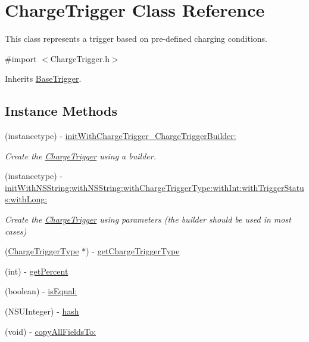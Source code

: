 \hypertarget{interface_charge_trigger}{}\section{Charge\+Trigger Class Reference}
\label{interface_charge_trigger}


This class represents a trigger based on pre-\/defined charging conditions.  




{\ttfamily \#import $<$Charge\+Trigger.\+h$>$}



Inherits \hyperlink{interface_base_trigger}{Base\+Trigger}.

\subsection*{Instance Methods}
\begin{DoxyCompactItemize}
\item 
(instancetype) -\/ \hyperlink{interface_charge_trigger_a77e84413cd24975d0b4c19c372094ea5}{init\+With\+Charge\+Trigger\+\_\+\+Charge\+Trigger\+Builder\+:}
\begin{DoxyCompactList}\small\item\em Create the \hyperlink{interface_charge_trigger}{Charge\+Trigger} using a builder. \end{DoxyCompactList}\item 
(instancetype) -\/ \hyperlink{interface_charge_trigger_a0c4f8f181fa712cfe1a5fa29a4ea68ef}{init\+With\+N\+S\+String\+:with\+N\+S\+String\+:with\+Charge\+Trigger\+Type\+:with\+Int\+:with\+Trigger\+Status\+:with\+Long\+:}
\begin{DoxyCompactList}\small\item\em Create the \hyperlink{interface_charge_trigger}{Charge\+Trigger} using parameters (the builder should be used in most cases) \end{DoxyCompactList}\item 
(\hyperlink{interface_charge_trigger_type}{Charge\+Trigger\+Type} $\ast$) -\/ \hyperlink{interface_charge_trigger_ab1edd9dadce859c501ad6982bdb6b4e7}{get\+Charge\+Trigger\+Type}
\item 
(int) -\/ \hyperlink{interface_charge_trigger_a5f85de8970ba2342af1863932042c651}{get\+Percent}
\item 
(boolean) -\/ \hyperlink{interface_charge_trigger_ab1b958f61c359c6adc39b4c3e75d2c75}{is\+Equal\+:}
\item 
(N\+S\+U\+Integer) -\/ \hyperlink{interface_charge_trigger_a256cfe4d4beecbd7d927ea6ac22379ff}{hash}
\item 
(void) -\/ \hyperlink{interface_charge_trigger_abbbac1dc7c6df160e086d7dab4c6c6c0}{copy\+All\+Fields\+To\+:}
\end{DoxyCompactItemize}
